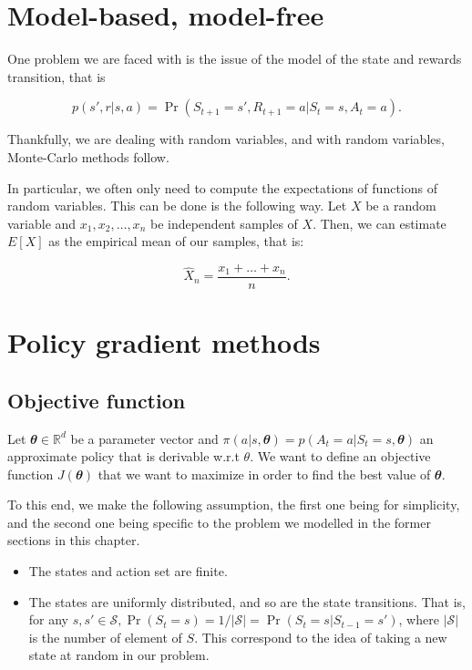 \documentclass[
  letterpaper,
]{report}
\providecommand{\tightlist}{%
  \setlength{\itemsep}{0pt}\setlength{\parskip}{0pt}}\usepackage{longtable,booktabs,array}
\theoremstyle{plain}
\theoremstyle{definition}
\theoremstyle{definition}
\theoremstyle{remark}
\begin{document}
\hypertarget{model-based-model-free}{%
\section{Model-based, model-free}\label{model-based-model-free}}

One problem we are faced with is the issue of the model of the state and
rewards transition, that is

\[
p(s',r|s,a) = \Pr(S_{t+1} = s', R_{t+1} = a | S_t = s, A_t = a).
\]

Thankfully, we are dealing with random variables, and with random
variables, Monte-Carlo methods follow.

In particular, we often only need to compute the expectations of
functions of random variables. This can be done is the following way.
Let \(X\) be a random variable and \(x_1, x_2, \dots , x_n\) be
independent samples of \(X\). Then, we can estimate \(E[X]\) as the
empirical mean of our samples, that is:

\[
\hat{X}_n = \frac{x_1 + \dots + x_n}{n}.
\]

\hypertarget{policy-gradient-methods}{%
\section{Policy gradient methods}\label{policy-gradient-methods}}

\hypertarget{objective-function}{%
\subsection{Objective function}\label{objective-function}}

Let \(\mathbfit{\theta} \in \mathbb{R}^d\) be a parameter vector and
\(\pi(a|s,\mathbfit{\theta}) = p(A_t = a | S_t = s , \mathbfit{\theta})\)
an approximate policy that is derivable w.r.t \(\theta\). We want to
define an objective function \(J(\mathbfit{\theta})\) that we want to
maximize in order to find the best value of \(\mathbfit{\theta}\).

To this end, we make the following assumption, the first one being for
simplicity, and the second one being specific to the problem we modelled
in the former sections in this chapter.

\begin{itemize}
\tightlist
\item
  The states and action set are finite.
\item
  The states are uniformly distributed, and so are the state
  transitions. That is, for any
  \(s,s'\in\mathcal{S}, \Pr(S_t = s) = 1 / |\mathcal{S}| = \Pr(S_t = s | S_{t-1} = s')\),
  where \(|\mathcal{S}|\) is the number of element of \(S\). This
  correspond to the idea of taking a new state at random in our problem.
\end{itemize}
\end{document}

